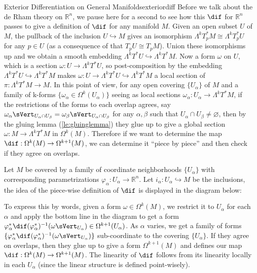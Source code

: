 \documentclass[12pt, a3paper, openany]{book}
\begin{document}
\begin{Remark}{Exterior Differentiation on General Manifolds}{exteriordiff}
Before we talk about the de Rham theory on $\mathbb{R}^n$, we pause here for a second to see how this $\dif $ for $\mathbb{R}^n$ passes to give a definition of $\dif$ for any manifold $M$. Given an open subset $U$ of $M$, the pullback of the inclusion $U\hookrightarrow M$ gives an isomorphism $\Lambda^k T_p^*M \cong \Lambda^k T_p^* U$ for any $p\in U$ (as a consequence of that $T_pU\cong T_p M$). Union these isomorphisms up and we obtain a smooth embedding $\Lambda^k T^*U\hookrightarrow \Lambda^k T^*M $. Now a form $\omega$ on $U$, which is a section $\omega:U\to \Lambda^k T^*U$, so post-composition by the embedding $\Lambda^k T^*U\hookrightarrow \Lambda^k T^*M $ makes $\omega: U\to \Lambda^k T^*U\hookrightarrow \Lambda^k T^*M $ a local section of $\pi: \Lambda^k T^*M \to M$. In this point of view, for any open covering $\{U_\alpha\}$ of $M$ and a family of k-forms $\{\omega_\alpha\in \Omega^k(U_\alpha)\}$ seeing as local sections $\omega_\alpha:U_\alpha\to \Lambda^k T^*M$, if the restrictions of the forms to each overlap agrees, say $\omega_\alpha \sVert_{U_\alpha\cap U_\beta}=\omega_\beta\sVert_{U_\alpha\cap U_\beta}$ for any $\alpha,\beta$ such that $U_\alpha\cap U_\beta\neq \varnothing$, then by the gluing lemma (\cref{le:gluinglemma}) they glue up to give a global section $\omega:M\to \Lambda^k T^*M$ in $\Omega^k(M)$. Therefore if we want to determine the map $\dif :\Omega^k(M)\to \Omega^{k+1}(M)$, we can determine it ``piece by piece'' and then check if they agree on overlaps.\par
Let $M$ be covered by a family of coordinate neighborhoods $\{U_\alpha\}$ with corresponding parametrizations $\varphi_\alpha:U_\alpha\to \mathbb{R}^n$. Let $i_\alpha:U_\alpha\hookrightarrow M$ be the inclusions, the idea of the piece-wise definition of $\dif$ is displayed in the diagram below:
\begin{center}
\end{center}
To express this by words, given a form $\omega\in \Omega^k(M)$, we restrict it to $U_\alpha$ for each $\alpha$ and apply the bottom line in the diagram to get a form $\varphi_\alpha^*\dif(\varphi_\alpha^*)^{-1}(\omega\sVert_{U_\alpha})\in \Omega^{k+1}(U_\alpha)$. As $\alpha$ varies, we get a family of forms $\{ \varphi_\alpha^*\dif(\varphi_\alpha^*)^{-1}(\omega\sVert_{U_\alpha})\}$ sub-coordinate to the covering $\{U_\alpha\}$. If they agree on overlaps, then they glue up to give a form $\Omega^{k+1}(M)$ and defines our map $\dif :\Omega^k(M)\to \Omega^{k+1}(M)$. The linearity of $\dif$ follows from its linearity locally in each $U_\alpha$ (since the linear structure is defined point-wisely). \par

\end{Remark}
\end{document}
